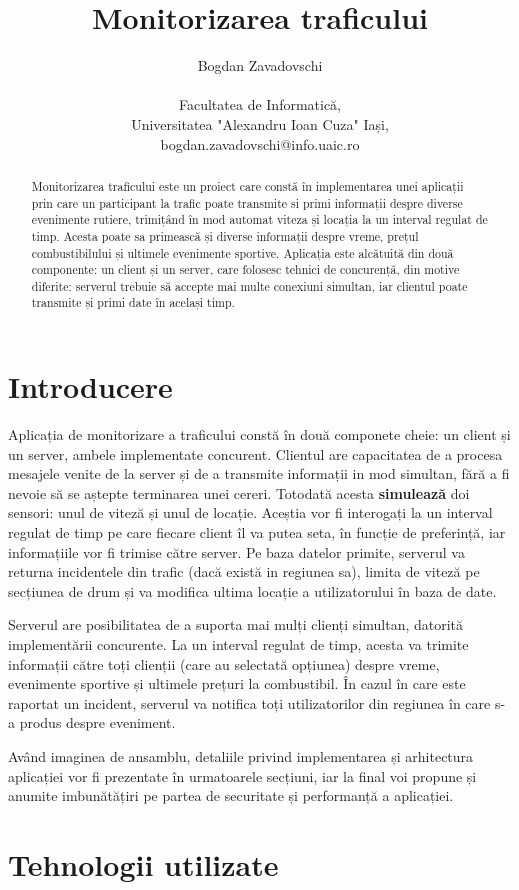 \documentclass{article}
\author{Bogdan Zavadovschi \protect\\ 
\protect\\
\small Facultatea de Informatică, 
\protect\\
\small Universitatea "Alexandru Ioan Cuza" Iași,
\protect\\ 
\small bogdan.zavadovschi@info.uaic.ro}
\title{
    \textbf{Monitorizarea traficului} 
}
\date{}
\begin{document}
\maketitle
\begin{abstract}
    Monitorizarea traficului este un proiect care constă în implementarea unei aplicații prin care un participant la trafic poate transmite si primi informații despre diverse evenimente rutiere, trimițând în mod automat viteza și locația la un interval regulat de timp. Acesta poate sa primească și diverse informații despre vreme, prețul combustibilului și ultimele evenimente sportive. Aplicația este alcătuită din două componente: un client și un server, care folosesc tehnici de concurență, din motive diferite: serverul trebuie să accepte mai multe conexiuni simultan, iar clientul poate transmite și primi date în același timp.
\end{abstract}
\section{Introducere}
Aplicația de monitorizare a traficului constă în două componete cheie: un client și un server, ambele implementate concurent. Clientul are capacitatea de a procesa mesajele venite de la server și de a transmite informații in mod simultan, fără a fi nevoie să se aștepte terminarea unei cereri. Totodată acesta \textbf{simulează} doi sensori: unul de viteză și unul de locație. Aceștia vor fi interogați la un interval regulat de timp pe care fiecare client îl va putea seta, în funcție de preferință, iar informațiile vor fi trimise către server. Pe baza datelor primite, serverul va returna incidentele din trafic (dacă există in regiunea sa), limita de viteză pe secțiunea de drum și va modifica ultima locație a utilizatorului în baza de date.

Serverul are posibilitatea de a suporta mai mulți clienți simultan, datorită implementării concurente. La un interval regulat de timp, acesta va trimite informații către toți clienții (care au selectată opțiunea) despre vreme, evenimente sportive și ultimele prețuri la combustibil. În cazul în care este raportat un incident, serverul va notifica toți utilizatorilor din regiunea în care s-a produs despre eveniment.   

Având imaginea de ansamblu, detaliile privind implementarea și arhitectura aplicației vor fi prezentate în urmatoarele secțiuni, iar la final voi propune și anumite imbunătățiri pe partea de securitate și performanță a aplicației. 
\section{Tehnologii utilizate}
\end{document}
